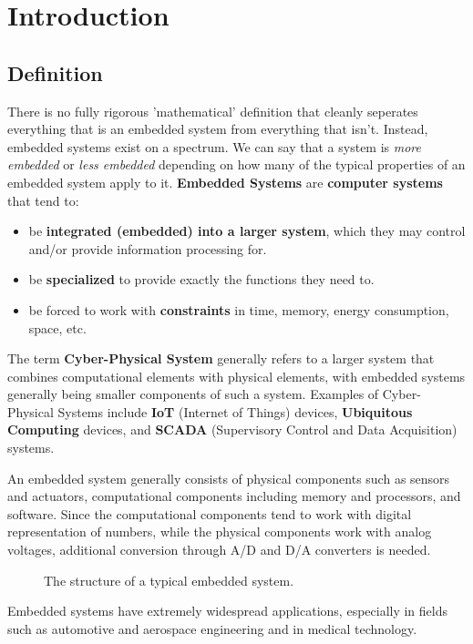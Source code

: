 \documentclass{report}
\newcommand{\tbf}{\textbf}
\newcommand*{\newpar}{\par\vspace{\baselineskip}\noindent} %
\begin{document}

\tableofcontents
\thispagestyle{fancy}
\chapter{Introduction}
\thispagestyle{fancy}
\section{Definition}
There is no fully rigorous 'mathematical' definition that cleanly seperates everything that is an embedded system from everything that isn't. Instead, embedded systems exist on a spectrum. We can say that a system is \textit{more embedded} or \textit{less embedded} depending on how many of the typical properties of an embedded system apply to it. \tbf{Embedded Systems} are \tbf{computer systems} that tend to:
\begin{itemize}
    \item be \tbf{integrated (embedded) into a larger system}, which they may control and/or provide information processing for.
    \item be \tbf{specialized} to provide exactly the functions they need to.
    \item be forced to work with \tbf{constraints} in time, memory, energy consumption, space, etc.
\end{itemize}
The term \tbf{Cyber-Physical System} generally refers to a larger system that combines computational elements with physical elements, with embedded systems generally being smaller components of such a system.
Examples of Cyber-Physical Systems include \tbf{IoT} (Internet of Things) devices, \tbf{Ubiquitous Computing} devices, and \tbf{SCADA} (Supervisory Control and Data Acquisition) systems.
\newpar
An embedded system generally consists of physical components such as sensors and actuators, computational components including memory and processors, and software. Since the computational components tend to work with digital representation of numbers, while the physical components work with analog voltages, additional conversion through A/D and D/A converters is needed.

\begin{figure}[h!]
\centering

\caption{The structure of a typical embedded system.}
\label{fig:embeddedsystemstructure}
\end{figure}

\newpar
Embedded systems have extremely widespread applications, especially in fields such as automotive and aerospace engineering and in medical technology.
\end{document}

